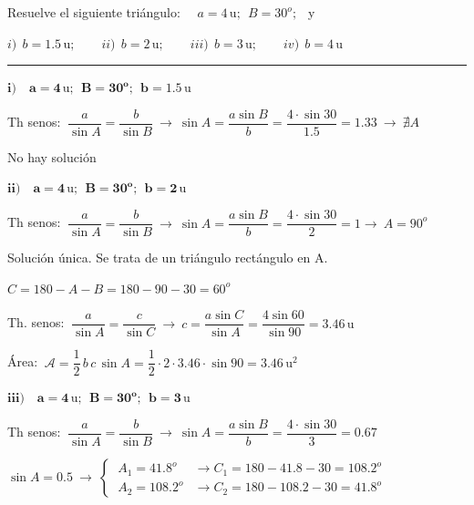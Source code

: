 \begin{miejercicio}

Resuelve el siguiente triángulo: $\quad a= 4\, \mathrm{u};\ \ B=30^o;\ \ $ y 

\vspace{2mm} $i)\ \ b=1.5 \, \mathrm{u}; \qquad ii)\ \ b=2 \, \mathrm{u}; \qquad  iii)\ \ b=3 \, \mathrm{u}; \qquad  iv)\ \ b=4 \, \mathrm{u}$

\rule{250pt}{0.1pt}

\vspace{4mm} $\boldsymbol{ i) \quad a= 4\, \mathrm{u};\ \ B=30^o;\ \ b=1.5\, \mathrm{u} }$

\vspace{2mm} Th senos: $\ \dfrac{a}{\sin A}=\dfrac{b}{\sin B} \ \to \ \sin A=\dfrac{a\sin B}{b}=\dfrac{4\cdot \sin 30}{1.5}=1.33 \ \to \ \nexists A$

\vspace{2mm} No hay solución

\vspace{6mm} $\boldsymbol{ ii) \quad a= 4\, \mathrm{u};\ \ B=30^o;\ \ b=2\, \mathrm{u} }$

\vspace{2mm} Th senos: $\ \dfrac{a}{\sin A}=\dfrac{b}{\sin B} \ \to \ \sin A=\dfrac{a\sin B}{b}=\dfrac{4\cdot \sin 30}{2}=1 \to \ A=90^o$

\vspace{2mm} Solución única. Se trata de un triángulo rectángulo en A.

\vspace{2mm} $C=180-A-B=180-90-30=60^o$

\vspace{2mm} Th. senos: $\ \dfrac{a}{\sin A}=\dfrac{c}{\sin C} \ \to \ c=\dfrac{a\sin C}{\sin A}=\dfrac{4\sin 60}{\sin 90}=3.46\, \mathrm{u}$

\vspace{2mm} Área: $\ \mathcal A=\dfrac 12\, b \, c \, \sin A=\dfrac 1 2 \cdot 2\cdot 3.46\cdot \sin 90=3.46 \, \mathrm{u}^2$



\vspace{6mm} $\boldsymbol{ iii) \quad a= 4\, \mathrm{u};\ \ B=30^o;\ \ b=3\, \mathrm{u} }$

\vspace{2mm}Th senos: $\ \dfrac{a}{\sin A}=\dfrac{b}{\sin B} \ \to \ \sin A=\dfrac{a\sin B}{b}=\dfrac{4\cdot \sin 30}{3}=0.67 $

\vspace{2mm} $\sin A=0.5 \ \to \ \begin{cases} 
\ A_1=41.8^o  &\to C_1=180-41.8-30=108.2^o
\\ 
\ A_2=108.2^o &\to C_2=180-108.2-30= 41.8^o
\end{cases}$


\end{miejercicio}
